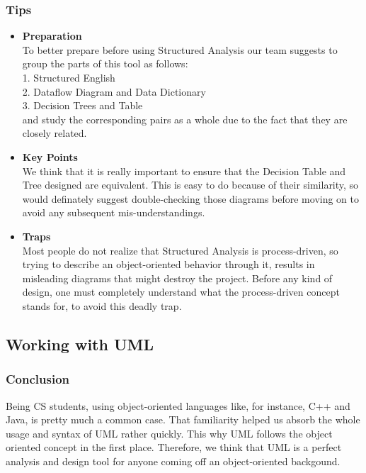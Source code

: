 \documentclass{article}
\begin{document}
\subsubsection{Tips}
\begin{itemize}
 \item \textbf{Preparation} \\
 To better prepare before using Structured Analysis our team suggests to group the parts 
 of this tool as follows:\\
 1. Structured English \\
 2. Dataflow Diagram and Data Dictionary\\ 
 3. Decision Trees and Table\\
 and study the corresponding pairs as a whole due to the fact that they are closely related. 
 
 \item \textbf{Key Points}\\
 We think that it is really important to ensure that the Decision Table and Tree designed are equivalent.
 This is easy to do because of their similarity, so would definately suggest double-checking those
 diagrams before moving on to avoid any subsequent mis-understandings.
 
 \item \textbf{Traps}\\
 Most people do not realize that Structured Analysis is process-driven, so trying
 to describe an object-oriented behavior through it, results in misleading diagrams that might destroy the project.
 Before any kind of design, one must completely understand what the process-driven concept stands for,
 to avoid this deadly trap.    
 
\end{itemize} 

\subsection{Working with UML}

\subsubsection{Conclusion}
Being CS students, using object-oriented languages like, for instance, C++ and Java, is pretty much a common case.
That familiarity helped us absorb the whole usage and syntax of UML rather quickly. This why UML follows the
object oriented concept in the first place. Therefore, we think that UML is a perfect analysis and design tool for anyone coming off an object-oriented backgound.
\end{document}
